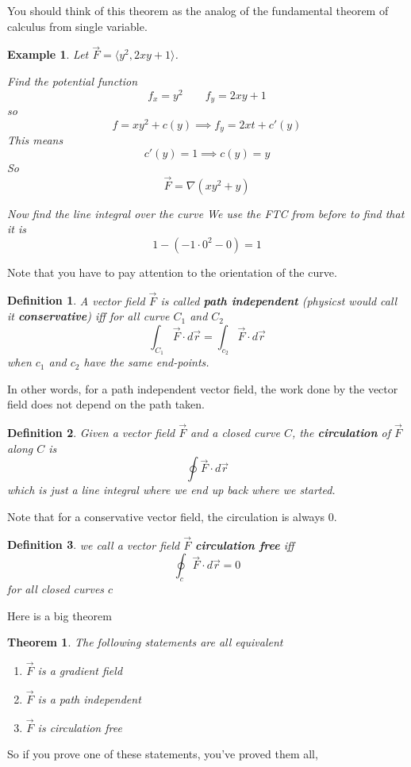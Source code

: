 \documentclass[11pt]{article}
\newtheorem{thm}{Theorem}
\newtheorem{defn}{Definition}
\newtheorem{ex}{Example}
\begin{document}
You should think of this theorem as the analog of the fundamental theorem of
calculus from single variable.

\begin{ex}
  Let $\vec{F} = \langle y^2 , 2xy+1 \rangle  $.

  Find the potential function
  \[f_x = y^2 \qquad f_y = 2xy+1\]
  so \[f = xy^2 + c(y) \implies f_y = 2xt + c'(y)\]
  This means \[c'(y) = 1 \implies c(y)  =y\]
  So
  \[\vec{F} = \nabla (xy^2 + y)\]

  Now find the line integral over the curve
We use the FTC from before to find that it is
\[1 - (-1 \cdot 0^2 -0)  = 1\]
\end{ex}
Note that you have to pay attention to the orientation of the curve.
\begin{defn}
  A vector field $\vec{F}$ is called \textbf{path independent} (physicst
  would call it \textbf{conservative}) iff
  for all curve $C_1$ and $C_2$
  \[\int_{C_1} \vec{F} \cdot d \vec{r} = \int_{c_2} \vec{F} \cdot d \vec{r}\]
  when $c_1$ and $c_2$ have the same end-points.
\end{defn}
In other words, for a path independent vector field, the work done by the
vector field does not depend on the path taken.

\begin{defn}
  Given a vector field $\vec{F}$ and a closed curve $C$, the
  \textbf{circulation} of $\vec{F}$ along $C$ is
  \[\oint \vec{F} \cdot d \vec{r}\]
  which is just a line integral where we end up back where we started.
\end{defn}

Note that for a conservative vector field, the circulation is always $0$.

\begin{defn}
  we call a vector field $\vec{F}$ \textbf{circulation free} iff
  \[\oint_c \vec{F} \cdot d\vec{r} = 0\]
  for all closed curves $c$
\end{defn}


Here is a big theorem

\begin{thm}
  The following statements are all equivalent
  \begin{enumerate}
    \item $\vec{F}$ is a gradient field
    \item $\vec{F}$ is a path independent
    \item $\vec{F}$ is circulation free
  \end{enumerate}
\end{thm}
So if you prove one of these statements, you've proved them all,
\end{document}
